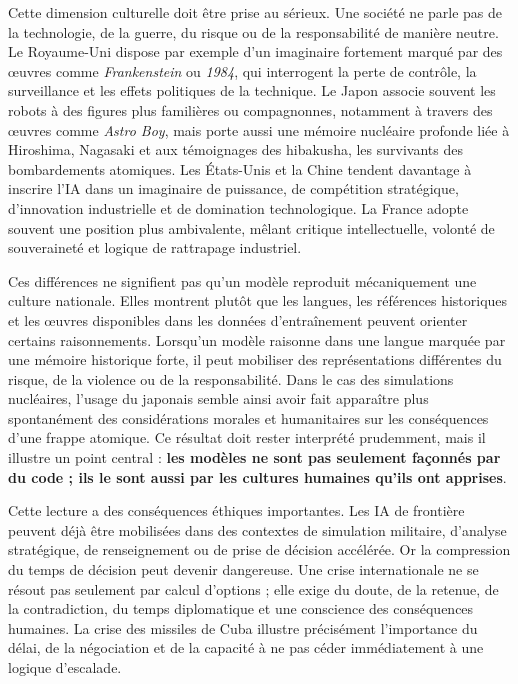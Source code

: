 \documentclass[
  10pt,
  a4paper,
  DIV=11,
  numbers=noendperiod,
  oneside]{scrreprt}
\let\oldtextbf\textbf
\renewcommand{\textbf}[1]{\oldtextbf{\textcolor{cmmnavy}{#1}}}
\let\oldemph\emph
\renewcommand{\emph}[1]{\oldemph{\textcolor{cmmgray}{#1}}}
\begin{document}
Cette dimension culturelle doit être prise au sérieux. Une société ne
parle pas de la technologie, de la guerre, du risque ou de la
responsabilité de manière neutre. Le Royaume-Uni dispose par exemple
d'un imaginaire fortement marqué par des œuvres comme
\emph{Frankenstein} ou \emph{1984}, qui interrogent la perte de
contrôle, la surveillance et les effets politiques de la technique. Le
Japon associe souvent les robots à des figures plus familières ou
compagnonnes, notamment à travers des œuvres comme \emph{Astro Boy},
mais porte aussi une mémoire nucléaire profonde liée à Hiroshima,
Nagasaki et aux témoignages des hibakusha, les survivants des
bombardements atomiques. Les États-Unis et la Chine tendent davantage à
inscrire l'IA dans un imaginaire de puissance, de compétition
stratégique, d'innovation industrielle et de domination technologique.
La France adopte souvent une position plus ambivalente, mêlant critique
intellectuelle, volonté de souveraineté et logique de rattrapage
industriel.

Ces différences ne signifient pas qu'un modèle reproduit mécaniquement
une culture nationale. Elles montrent plutôt que les langues, les
références historiques et les œuvres disponibles dans les données
d'entraînement peuvent orienter certains raisonnements. Lorsqu'un modèle
raisonne dans une langue marquée par une mémoire historique forte, il
peut mobiliser des représentations différentes du risque, de la violence
ou de la responsabilité. Dans le cas des simulations nucléaires, l'usage
du japonais semble ainsi avoir fait apparaître plus spontanément des
considérations morales et humanitaires sur les conséquences d'une frappe
atomique. Ce résultat doit rester interprété prudemment, mais il
illustre un point central : \textbf{les modèles ne sont pas seulement
façonnés par du code ; ils le sont aussi par les cultures humaines
qu'ils ont apprises}.

Cette lecture a des conséquences éthiques importantes. Les IA de
frontière peuvent déjà être mobilisées dans des contextes de simulation
militaire, d'analyse stratégique, de renseignement ou de prise de
décision accélérée. Or la compression du temps de décision peut devenir
dangereuse. Une crise internationale ne se résout pas seulement par
calcul d'options ; elle exige du doute, de la retenue, de la
contradiction, du temps diplomatique et une conscience des conséquences
humaines. La crise des missiles de Cuba illustre précisément
l'importance du délai, de la négociation et de la capacité à ne pas
céder immédiatement à une logique d'escalade.
\end{document}
